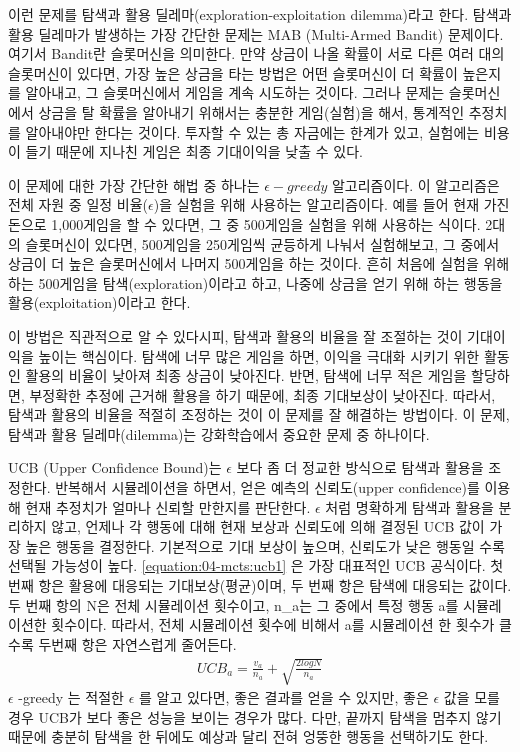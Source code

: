 \documentclass[letterpaper,10pt,english]{sphinxmanual}
\begin{document}
이런 문제를 탐색과 활용 딜레마(exploration-exploitation dilemma)라고 한다.
탐색과 활용 딜레마가 발생하는 가장 간단한 문제는 MAB (Multi-Armed Bandit) 문제이다.
여기서 Bandit란 슬롯머신을 의미한다. 만약 상금이 나올 확률이 서로 다른 여러 대의 슬롯머신이 있다면,
가장 높은 상금을 타는 방법은 어떤 슬롯머신이 더 확률이 높은지를 알아내고, 그 슬롯머신에서 게임을 계속 시도하는 것이다.
그러나 문제는 슬롯머신에서 상금을 탈 확률을 알아내기 위해서는 충분한 게임(실험)을 해서,
통계적인 추정치를 알아내야만 한다는 것이다. 투자할 수 있는 총 자금에는 한계가 있고,
실험에는 비용이 들기 때문에 지나친 게임은 최종 기대이익을 낮출 수 있다.

이 문제에 대한 가장 간단한 해법 중 하나는 \(\epsilon-greedy\) 알고리즘이다.
이 알고리즘은 전체 자원 중 일정 비율(\(\epsilon\))을 실험을 위해 사용하는 알고리즘이다.
예를 들어 현재 가진 돈으로 1,000게임을 할 수 있다면, 그 중 500게임을 실험을 위해 사용하는 식이다.
2대의 슬롯머신이 있다면, 500게임을 250게임씩 균등하게 나눠서 실험해보고, 그 중에서 상금이 더 높은 슬롯머신에서
나머지 500게임을 하는 것이다. 흔히 처음에 실험을 위해 하는 500게임을 탐색(exploration)이라고 하고,
나중에 상금을 얻기 위해 하는 행동을 활용(exploitation)이라고 한다.

이 방법은 직관적으로 알 수 있다시피, 탐색과 활용의 비율을 잘 조절하는 것이 기대이익을 높이는 핵심이다.
탐색에 너무 많은 게임을 하면, 이익을 극대화 시키기 위한 활동인 활용의 비율이 낮아져 최종 상금이 낮아진다.
반면, 탐색에 너무 적은 게임을 할당하면, 부정확한 추정에 근거해 활용을 하기 때문에, 최종 기대보상이 낮아진다.
따라서, 탐색과 활용의 비율을 적절히 조정하는 것이 이 문제를 잘 해결하는 방법이다.
이 문제, 탐색과 활용 딜레마(dilemma)는 강화학습에서 중요한 문제 중 하나이다.

UCB (Upper Confidence Bound)는 \(\epsilon\) 보다 좀 더 정교한 방식으로 탐색과 활용을 조정한다.
반복해서 시뮬레이션을 하면서, 얻은 예측의 신뢰도(upper confidence)를 이용해 현재 추정치가 얼마나 신뢰할 만한지를 판단한다.
\(\epsilon\) 처럼 명확하게 탐색과 활용을 분리하지 않고, 언제나 각 행동에 대해 현재 보상과 신뢰도에 의해 결정된
UCB 값이 가장 높은 행동을 결정한다. 기본적으로 기대 보상이 높으며, 신뢰도가 낮은 행동일 수록 선택될 가능성이 높다.
\eqref{equation:04-mcts:ucb1} 은 가장 대표적인 UCB 공식이다. 첫 번째 항은 활용에 대응되는 기대보상(평균)이며,
두 번째 항은 탐색에 대응되는 값이다. 두 번째 항의 N은 전체 시뮬레이션 횟수이고, n\_a는 그 중에서 특정 행동 a를 시뮬레이션한
횟수이다. 따라서, 전체 시뮬레이션 횟수에 비해서 a를 시뮬레이션 한 횟수가 클 수록 두번째 항은 자연스럽게 줄어든다.
\begin{equation}\label{equation:04-mcts:ucb1}
\begin{split}UCB_a = \frac{v_a}{n_a} + \sqrt{\frac{2log{N}}{n_a}}\end{split}
\end{equation}
\(\epsilon\) -greedy 는 적절한 \(\epsilon\) 를 알고 있다면, 좋은 결과를 얻을 수 있지만,
좋은 \(\epsilon\) 값을 모를 경우 UCB가 보다 좋은 성능을 보이는 경우가 많다. 다만, 끝까지 탐색을 멈추지 않기 때문에
충분히 탐색을 한 뒤에도 예상과 달리 전혀 엉뚱한 행동을 선택하기도 한다.
\end{document}
